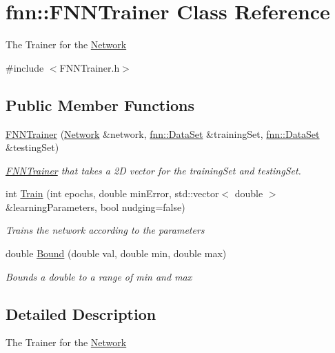 \hypertarget{classfnn_1_1_f_n_n_trainer}{}\section{fnn\+:\+:F\+N\+N\+Trainer Class Reference}
\label{classfnn_1_1_f_n_n_trainer}


The Trainer for the \hyperlink{classfnn_1_1_network}{Network}  




{\ttfamily \#include $<$F\+N\+N\+Trainer.\+h$>$}

\subsection*{Public Member Functions}
\begin{DoxyCompactItemize}
\item 
\hyperlink{classfnn_1_1_f_n_n_trainer_a3901c13c5530a773d19aad4628b94bdc}{F\+N\+N\+Trainer} (\hyperlink{classfnn_1_1_network}{Network} \&network, \hyperlink{classfnn_1_1_data_set}{fnn\+::\+Data\+Set} \&training\+Set, \hyperlink{classfnn_1_1_data_set}{fnn\+::\+Data\+Set} \&testing\+Set)
\begin{DoxyCompactList}\small\item\em \hyperlink{classfnn_1_1_f_n_n_trainer}{F\+N\+N\+Trainer} that takes a 2\+D vector for the training\+Set and testing\+Set. \end{DoxyCompactList}\item 
int \hyperlink{classfnn_1_1_f_n_n_trainer_ae6f05de7c7ec7561c8f0ccae921a3027}{Train} (int epochs, double min\+Error, std\+::vector$<$ double $>$ \&learning\+Parameters, bool nudging=false)
\begin{DoxyCompactList}\small\item\em Trains the network according to the parameters \end{DoxyCompactList}\item 
double \hyperlink{classfnn_1_1_f_n_n_trainer_aef68720681e9b575cb98d79d43d6baed}{Bound} (double val, double min, double max)
\begin{DoxyCompactList}\small\item\em Bounds a double to a range of min and max \end{DoxyCompactList}\end{DoxyCompactItemize}


\subsection{Detailed Description}
The Trainer for the \hyperlink{classfnn_1_1_network}{Network} 

